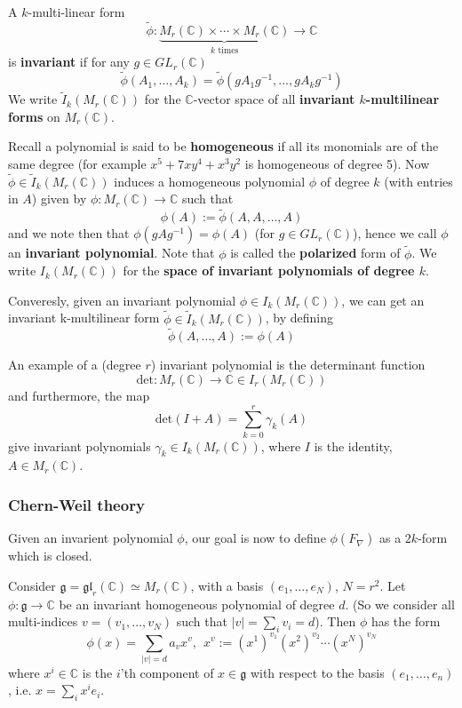 \documentclass[a4paper]{article}
\theoremstyle{definition} \newtheorem*{definition}{Definition}
\theoremstyle{definition} \newtheorem*{definitions}{Definitions}
\theoremstyle{plain} \newtheorem{theorem}{Theorem}[section]
\theoremstyle{plain} \newtheorem{proposition}[theorem]{Proposition}
\theoremstyle{plain} \newtheorem{corollary}[theorem]{Corollary}
\theoremstyle{plain} \newtheorem{lemma}[theorem]{Lemma}
\theoremstyle{plain} \newtheorem{example}[theorem]{Example}
\newcommand{\defn}[1]{\textbf{#1}}
\newcommand{\complexnos}{\mathbb{C}}
\begin{document}
A $k$-multi-linear form $$\tilde{\phi}:\underbrace{M_r(\complexnos)\times \cdots \times M_r(\complexnos)}_{k \text{ times}}\to \complexnos$$
is \defn{invariant} if for any $g\in GL_r(\complexnos)$
$$\tilde{\phi}(A_1, \ldots, A_k) = \tilde{\phi}(gA_1g^{-1}, \ldots, gA_kg^{-1})$$
We write $\tilde{I}_k(M_r(\complexnos))$ for the $\complexnos$-vector space of all \defn{invariant $k$-multilinear forms} on $M_r(\complexnos)$. 

Recall a polynomial is said to be \defn{homogeneous} if all its monomials are of the same degree (for example $x^5 + 7xy^4 + x^3y^2$ is homogeneous of degree 5). Now $\tilde{\phi}\in \tilde{I}_k(M_r(\complexnos))$ induces a homogeneous polynomial $\phi$ of degree $k$ (with entries in $A$) given by $\phi:M_r(\complexnos)\to \complexnos$ such that
$$\phi(A):=\tilde{\phi}(A, A, \ldots, A)$$
and we note then that $\phi(gAg^{-1})=\phi(A)$ (for $g\in GL_r(\complexnos)$), hence we call $\phi$ an \defn{invariant polynomial}. Note that $\phi$ is called the \defn{polarized} form of $\tilde{\phi}$. We write $I_k(M_r(\complexnos))$ for the \defn{space of invariant polynomials of degree $k$}. 

Converesly, given an invariant polynomial $\phi \in I_k(M_r(\complexnos))$, we can get an invariant k-multilinear form $\tilde{\phi} \in \tilde{I}_k(M_r(\complexnos))$, by defining
$$\tilde{\phi}(A, \ldots, A):=\phi(A)$$

An example of a (degree $r$) invariant polynomial is the determinant function
$$\text{det}:M_r(\complexnos)\to \complexnos \in I_r(M_r(\complexnos))$$
and furthermore, the map
$$\text{det}(I+A)=\sum_{k=0}^r \gamma_k(A) $$
give invariant polynomials $\gamma_k\in I_k(M_r(\complexnos))$, where $I$ is the identity, $A \in M_r(\complexnos)$.

\subsubsection{Chern-Weil theory}
Given an invarient polynomial $\phi$, our goal is now to define $\phi(F_\nabla)$ as a $2k$-form which is closed. 

Consider $\mathfrak{g}=\mathfrak{gl}_r(\complexnos)\simeq M_r(\complexnos)$, with a basis $(e_1, \ldots, e_N)$, $N=r^2$. Let $\phi:\mathfrak{g}\to \complexnos$ be an invariant homogeneous polynomial of degree $d$. (So we consider all multi-indices $v=(v_1, \ldots, v_N)$ such that $|v|=\sum_i v_i = d$). Then $\phi$ has the form 
$$\phi(x)=\sum_{|v|=d} a_v x^v, \ \ x^v := (x^1)^{v_1}(x^2)^{v_2}\cdots (x^N)^{v_N}$$
where $x^i\in \complexnos$ is the $i$'th component of $x\in \mathfrak{g}$ with respect to the basis $(e_1, \ldots, e_n)$, i.e. $x=\sum_i x^i e_i$. 
\end{document}
